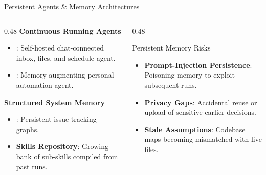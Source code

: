 \begin{frame}{Persistent Agents \& Memory Architectures}
  \begin{columns}[T, onlytextwidth]
    \begin{column}{0.48\textwidth}
      \textbf{Continuous Running Agents}
      \begin{itemize}
        \item {}: Self-hosted chat-connected inbox, files, and schedule agent.
        \item {}: Memory-augmenting personal automation agent.
      \end{itemize}
      \vspace{0.4em}
      \textbf{Structured System Memory}
      \begin{itemize}
        \item {}: Persistent issue-tracking graphs.
        \item \textbf{Skills Repository}: Growing bank of sub-skills compiled from past runs.
      \end{itemize}
    \end{column}
    \hfill
    \begin{column}{0.48\textwidth}
      \begin{alertblock}{Persistent Memory Risks}
        \begin{itemize}
          \item \textbf{Prompt-Injection Persistence}: Poisoning memory to exploit subsequent runs.
          \item \textbf{Privacy Gaps}: Accidental reuse or upload of sensitive earlier decisions.
          \item \textbf{Stale Assumptions}: Codebase maps becoming mismatched with live files.
        \end{itemize}
      \end{alertblock}
    \end{column}
  \end{columns}
\end{frame}

